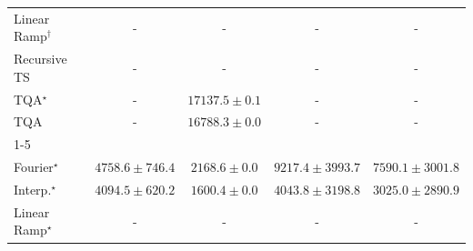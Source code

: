 \begin{tabular}{l|cccc|}
Linear Ramp$^\dagger$ & {\cellcolor[HTML]{000000}} \color[HTML]{F1F1F1} {\cellcolor{white}} \color{black} - & {\cellcolor[HTML]{000000}} \color[HTML]{F1F1F1} {\cellcolor{white}} \color{black} - & {\cellcolor[HTML]{000000}} \color[HTML]{F1F1F1} {\cellcolor{white}} \color{black} - & {\cellcolor[HTML]{000000}} \color[HTML]{F1F1F1} {\cellcolor{white}} \color{black} - \\
Recursive TS & {\cellcolor[HTML]{000000}} \color[HTML]{F1F1F1} {\cellcolor{white}} \color{black} - & {\cellcolor[HTML]{000000}} \color[HTML]{F1F1F1} {\cellcolor{white}} \color{black} - & {\cellcolor[HTML]{000000}} \color[HTML]{F1F1F1} {\cellcolor{white}} \color{black} - & {\cellcolor[HTML]{000000}} \color[HTML]{F1F1F1} {\cellcolor{white}} \color{black} - \\
TQA$^\star$ & {\cellcolor[HTML]{000000}} \color[HTML]{F1F1F1} {\cellcolor{white}} \color{black} - & {\cellcolor[HTML]{0C723B}} \color[HTML]{F1F1F1} $17137.5\pm 0.1$ & {\cellcolor[HTML]{000000}} \color[HTML]{F1F1F1} {\cellcolor{white}} \color{black} - & {\cellcolor[HTML]{000000}} \color[HTML]{F1F1F1} {\cellcolor{white}} \color{black} - \\
TQA & {\cellcolor[HTML]{000000}} \color[HTML]{F1F1F1} {\cellcolor{white}} \color{black} - & {\cellcolor[HTML]{7CC87B}} \color[HTML]{000000} $16788.3\pm 0.0$ & {\cellcolor[HTML]{000000}} \color[HTML]{F1F1F1} {\cellcolor{white}} \color{black} - & {\cellcolor[HTML]{000000}} \color[HTML]{F1F1F1} {\cellcolor{white}} \color{black} - \\
\cline{1-5}
\multicolumn{5}{c}{\rule{0pt}{8pt}SV} \\
\midrule
Fourier$^\star$ & {\cellcolor[HTML]{96B6D7}} \color[HTML]{000000} $4758.6\pm 746.4$ & {\cellcolor[HTML]{F4EDF6}} \color[HTML]{000000} $2168.6\pm 0.0$ & {\cellcolor[HTML]{023858}} \color[HTML]{F1F1F1} $9217.4\pm 3993.7$ & {\cellcolor[HTML]{0569A5}} \color[HTML]{F1F1F1} $7590.1\pm 3001.8$ \\
Interp.$^\star$ & {\cellcolor[HTML]{B7C5DF}} \color[HTML]{000000} $4094.5\pm 620.2$ & {\cellcolor[HTML]{FFF7FB}} \color[HTML]{000000} $1600.4\pm 0.0$ & {\cellcolor[HTML]{B8C6E0}} \color[HTML]{000000} $4043.8\pm 3198.8$ & {\cellcolor[HTML]{DFDDEC}} \color[HTML]{000000} $3025.0\pm 2890.9$ \\
Linear Ramp$^\star$ & {\cellcolor[HTML]{000000}} \color[HTML]{F1F1F1} {\cellcolor{white}} \color{black} - & {\cellcolor[HTML]{000000}} \color[HTML]{F1F1F1} {\cellcolor{white}} \color{black} - & {\cellcolor[HTML]{000000}} \color[HTML]{F1F1F1} {\cellcolor{white}} \color{black} - & {\cellcolor[HTML]{000000}} \color[HTML]{F1F1F1} {\cellcolor{white}} \color{black} - \\

\end{tabular}
